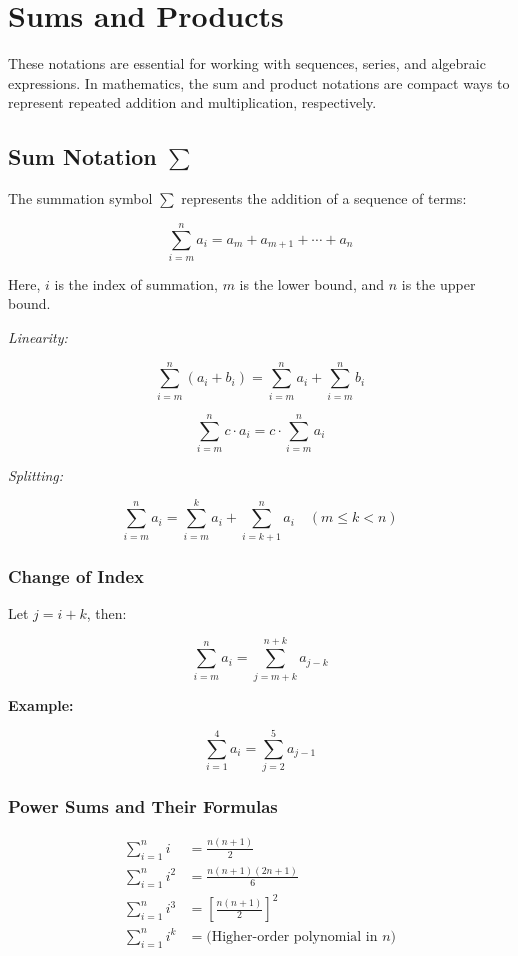 \chapter{Sums and Products}

These notations are essential for working with sequences, series, and algebraic expressions.
In mathematics, the sum and product notations are compact ways to represent repeated addition and multiplication, respectively.

\section{Sum Notation \texorpdfstring{\(\sum\)}{∑}}

The summation symbol \(\sum\) represents the addition of a sequence of terms:

\[
    \sum_{i = m}^{n} a_i = a_m + a_{m+1} + \cdots + a_n
\]

Here, \(i\) is the index of summation, \(m\) is the lower bound, and \(n\) is the upper bound.

\emph{Linearity:}

\[
    \sum_{i = m}^{n} (a_i + b_i) = \sum_{i = m}^{n} a_i + \sum_{i = m}^{n} b_i
\]
    
\[
    \sum_{i = m}^{n} c \cdot a_i = c \cdot \sum_{i = m}^{n} a_i
\]

\emph{Splitting:}
    
\[
    \sum_{i = m}^{n} a_i = \sum_{i = m}^{k} a_i + \sum_{i = k+1}^{n} a_i \quad (m \le k < n)
\]

\subsection{Change of Index}

Let \(j = i + k\), then:

\[
    \sum_{i = m}^{n} a_i = \sum_{j = m + k}^{n + k} a_{j - k}
\]

\textbf{Example:}

\[
    \sum_{i = 1}^{4} a_i = \sum_{j = 2}^{5} a_{j - 1}
\]

\subsection{Power Sums and Their Formulas}

\begin{align*}
    \sum_{i = 1}^{n} i &= \frac{n(n+1)}{2} \\
    \sum_{i = 1}^{n} i^2 &= \frac{n(n+1)(2n+1)}{6} \\
    \sum_{i = 1}^{n} i^3 &= {\left[\frac{n(n+1)}{2}\right]}^2 \\
    \sum_{i = 1}^{n} i^k &= \text{(Higher-order polynomial in \(n\))}
\end{align*}

